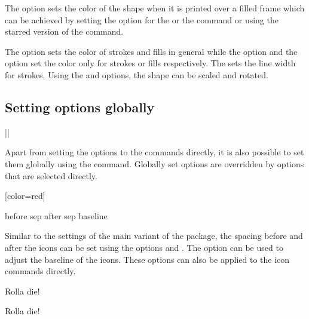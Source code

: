 \documentclass[a4paper]{article}
\begin{document}
The  option sets the color of the shape when it is printed over a filled frame which can be achieved by setting the  option for the \macro{\ability} or the \macro{\spellschool} command or using the starred version of the \macro{\DndIconsUseIcon} command.

The  option sets the color of strokes and fills in general while the  option and the  option set the color only for strokes or fills respectively. The  sets the line width for strokes. Using the  and  options, the shape can be scaled and rotated.

\subsection{Setting options globally}

\begin{macrodef}
|\dndiconsset|
\end{macrodef}
Apart from setting the options to the commands directly, it is also possible to set them globally using the \macro{\dndiconsset} command. Globally set options are overridden by options that are selected directly.

\begin{codeexample}

[color=red]
\end{codeexample}

\begin{macrodef}
before sep
after sep
baseline
\end{macrodef}
Similar to the settings of the main variant of the package, the spacing before and after the icons can be set using the options  and . The option  can be used to adjust the baseline of the icons. These options can also be applied to the icon commands directly.

\begin{codeexample}
Rolla die!

Rolla die!
\end{codeexample}

\printchanges
\end{document}
